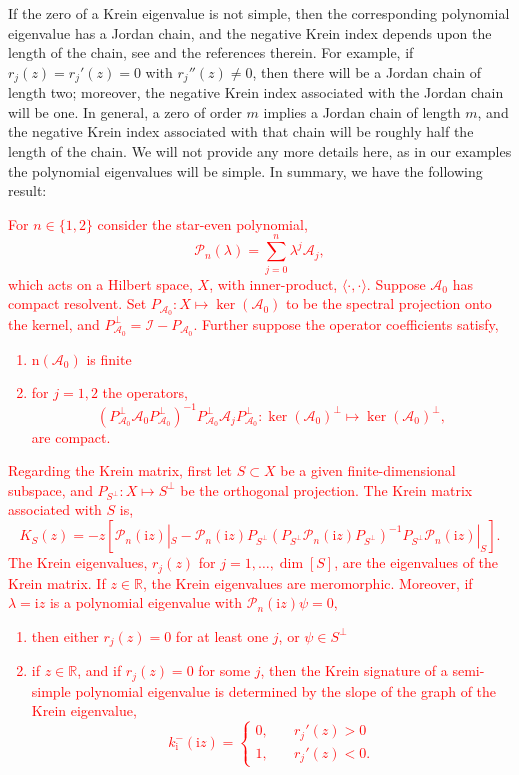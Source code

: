 \documentclass[review,onefignum,onetabnum]{siamart171218}
\newcommand{\R}{\mathbb{R}}
\def\dim{\mathop\mathrm{dim}\nolimits}
\def\ker{\mathop\mathrm{ker}\nolimits}
\newcommand{\rmi}{\mathrm{i}}
\newcommand{\rmn}{\mathrm{n}}
\newcommand{\calA}{\mathcal{A}}
\newcommand{\calI}{\mathcal{I}}
\newcommand{\calP}{\mathcal{P}}
\newcommand{\vK}{\bm{\mathit{K}}}
\newcommand{\revised}[1]{ \textcolor{red}{#1} }
\begin{document}
If the zero of a Krein eigenvalue is not simple, then the corresponding
polynomial eigenvalue has a Jordan chain, and the negative Krein index
depends upon the length of the chain, see \cite[Section~2.2]{kapitula:tks10} and the references therein. For example, if $r_j(z)=r_j'(z)=0$ with $r_j''(z)\neq0$, then there will be a Jordan chain of length two; moreover, the negative Krein index associated with the Jordan chain will be one. In general, a zero of order $m$ implies a Jordan chain of length $m$, and the negative Krein index associated with that chain will be roughly half the length of the chain. We
will not provide any more details here, as in our examples the polynomial eigenvalues will be simple. In summary,
we have the following result:

\revised{
\begin{theorem}\label{thm:krein}
For $n\in\{1,2\}$ consider the star-even polynomial,
\[
\calP_n(\lambda)=\sum_{j=0}^n\lambda^j\calA_j,
\]
which acts on a Hilbert space, $X$, with inner-product,
$\langle\cdot,\cdot\rangle$.  Suppose $\calA_0$ has compact resolvent. Set $P_{\calA_0}:X\mapsto\ker(\calA_0)$ to be the spectral projection onto the kernel, and
    $P_{\calA_0}^\perp=\calI-P_{\calA_0}$. Further suppose the operator coefficients satisfy,
\begin{enumerate}
\item $\rmn(\calA_0)$ is finite
\item for $j=1,2$ the
    operators,
\[
\left(P_{\calA_0}^\perp\calA_0P_{\calA_0}^\perp\right)^{-1}
P_{\calA_0}^\perp\calA_jP_{\calA_0}^\perp:\ker(\calA_0)^\perp\mapsto\ker(\calA_0)^\perp,
\]
are compact.
\end{enumerate}
Regarding the Krein matrix, first let $S\subset X$ be a given finite-dimensional subspace, and $P_{S^\perp}:X\mapsto S^\perp$ be the orthogonal
projection. The Krein matrix associated with $S$ is,
\[
\vK_S(z)=-z\left[\calP_n(\rmi z)|_S-%
\calP_n(\rmi z)P_{S^\perp}(P_{S^\perp}\calP_n(\rmi z)P_{S^\perp})^{-1}P_{S^\perp}\calP_n(\rmi z)|_{S}\right].
\]
The Krein eigenvalues, $r_j(z)$ for $j=1,\dots,\dim[S]$, are the eigenvalues of the Krein matrix. If $z\in\R$, the Krein eigenvalues are meromorphic. Moreover, if $\lambda=\rmi z$ is a polynomial
eigenvalue with $\calP_n(\rmi z)\psi=0$,
\begin{enumerate}
\item then either $r_j(z)=0$ for at least one $j$, or $\psi\in S^\perp$
\item if $z\in\R$, and if $r_j(z)=0$ for some $j$, then the Krein
    signature of a semi-simple polynomial eigenvalue is determined by the slope of the graph of the Krein eigenvalue,
\[
k_\rmi^-(\rmi z)=\begin{cases}0,\quad&r_j'(z)>0\\1,\quad&r_j'(z)<0.\end{cases}
\]
\end{enumerate}
\end{theorem}
}
\end{document}
